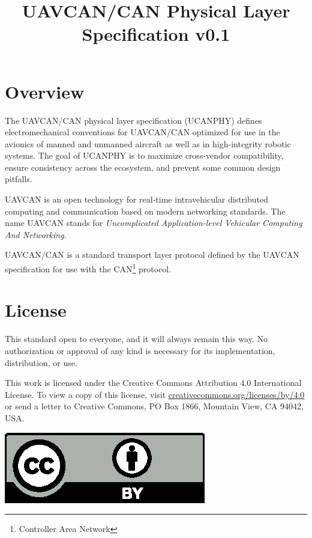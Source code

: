 \documentclass{uavcandoc}
\title{UAVCAN/CAN Physical Layer Specification v0.1}
\begin{document}
\frontmatter

\begin{titlepage}

\section*{Overview}

The UAVCAN/CAN physical layer specification (UCANPHY) defines electromechanical conventions for {UAVCAN/CAN}
optimized for use in the avionics of manned and unmanned aircraft as well as in high-integrity robotic systems.
The goal of UCANPHY is to maximize cross-vendor compatibility, ensure consistency across the ecosystem, and
prevent some common design pitfalls.

UAVCAN is an open technology for real-time intravehicular distributed computing and communication
based on modern networking standards.
The name UAVCAN stands for \emph{Uncomplicated Application-level Vehicular Computing And Networking}.

UAVCAN/CAN is a standard transport layer protocol defined by the UAVCAN specification for use with
the CAN\footnote{Controller Area Network} protocol.

\BeginRightColumn

\section*{License}

This standard open to everyone, and it will always remain this way.
No authorization or approval of any kind is necessary for its implementation, distribution, or use.

This work is licensed under the Creative Commons Attribution 4.0 International License.
To view a copy of this license, visit
\href{http://creativecommons.org/licenses/by/4.0/}{creativecommons.org/licenses/by/4.0}
or send a letter to Creative Commons, PO Box 1866, Mountain View, CA 94042, USA.

\hspace*{\fill}\includegraphics[height=1.75\baselineskip]{cc-by}\hspace*{\fill}


\end{titlepage}
\end{document}
